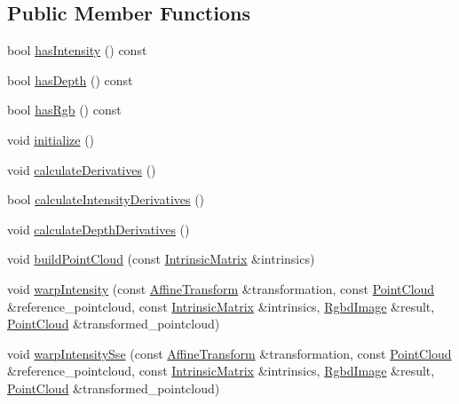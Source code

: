 \subsection*{Public Member Functions}
\begin{DoxyCompactItemize}
\item 
bool \mbox{\hyperlink{structdvo_1_1core_1_1_rgbd_image_aedc1a49823b9cc5afe16ace4b682fdb8}{has\+Intensity}} () const
\item 
bool \mbox{\hyperlink{structdvo_1_1core_1_1_rgbd_image_af939012f350c641cce1a7dc19c6a5967}{has\+Depth}} () const
\item 
bool \mbox{\hyperlink{structdvo_1_1core_1_1_rgbd_image_a9971d723c09f5eab20f5487993eb6b71}{has\+Rgb}} () const
\item 
void \mbox{\hyperlink{structdvo_1_1core_1_1_rgbd_image_ae75d152196893d0a8e7ca64f9142da82}{initialize}} ()
\item 
void \mbox{\hyperlink{structdvo_1_1core_1_1_rgbd_image_a7e92fbbf098e63f7eb9263775b99d606}{calculate\+Derivatives}} ()
\item 
bool \mbox{\hyperlink{structdvo_1_1core_1_1_rgbd_image_a66f7d5b2cd026ac8ec0b2e6a131f7aa6}{calculate\+Intensity\+Derivatives}} ()
\item 
void \mbox{\hyperlink{structdvo_1_1core_1_1_rgbd_image_aeca20a5666f5c9a532451e969d94e7bc}{calculate\+Depth\+Derivatives}} ()
\item 
void \mbox{\hyperlink{structdvo_1_1core_1_1_rgbd_image_ac034e5b79b4f39525d9a1eab1f98ec70}{build\+Point\+Cloud}} (const \mbox{\hyperlink{structdvo_1_1core_1_1_intrinsic_matrix}{Intrinsic\+Matrix}} \&intrinsics)
\item 
void \mbox{\hyperlink{structdvo_1_1core_1_1_rgbd_image_a9f476f47d4970842c7e9f96f6ad1c7a3}{warp\+Intensity}} (const \mbox{\hyperlink{namespacedvo_1_1core_af89a8f837f3ae51ed196b7988e59e53d}{Affine\+Transform}} \&transformation, const \mbox{\hyperlink{structdvo_1_1core_1_1_rgbd_image_a56820965eb98427d06e6733fe333cdc5}{Point\+Cloud}} \&reference\+\_\+pointcloud, const \mbox{\hyperlink{structdvo_1_1core_1_1_intrinsic_matrix}{Intrinsic\+Matrix}} \&intrinsics, \mbox{\hyperlink{structdvo_1_1core_1_1_rgbd_image}{Rgbd\+Image}} \&result, \mbox{\hyperlink{structdvo_1_1core_1_1_rgbd_image_a56820965eb98427d06e6733fe333cdc5}{Point\+Cloud}} \&transformed\+\_\+pointcloud)
\item 
void \mbox{\hyperlink{structdvo_1_1core_1_1_rgbd_image_a055ec4d22938a6deb2b2fabfe083aca3}{warp\+Intensity\+Sse}} (const \mbox{\hyperlink{namespacedvo_1_1core_af89a8f837f3ae51ed196b7988e59e53d}{Affine\+Transform}} \&transformation, const \mbox{\hyperlink{structdvo_1_1core_1_1_rgbd_image_a56820965eb98427d06e6733fe333cdc5}{Point\+Cloud}} \&reference\+\_\+pointcloud, const \mbox{\hyperlink{structdvo_1_1core_1_1_intrinsic_matrix}{Intrinsic\+Matrix}} \&intrinsics, \mbox{\hyperlink{structdvo_1_1core_1_1_rgbd_image}{Rgbd\+Image}} \&result, \mbox{\hyperlink{structdvo_1_1core_1_1_rgbd_image_a56820965eb98427d06e6733fe333cdc5}{Point\+Cloud}} \&transformed\+\_\+pointcloud)

\end{DoxyCompactItemize}
